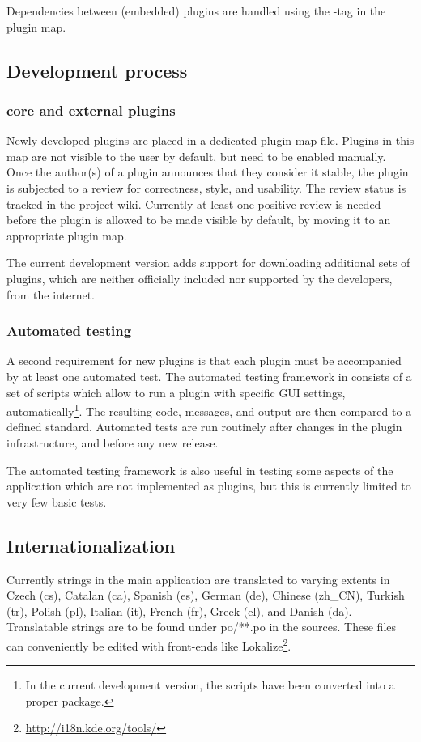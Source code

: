 Dependencies between (embedded) plugins are handled using the -tag in the plugin map.

\subsection{Development process}
\subsubsection[RKWard core and external plugins]{ core and external plugins}
\label{sec:technical_processes_plugins}
Newly developed plugins are placed in a dedicated plugin map file.
Plugins in this map are not visible to the user by
default, but need to be enabled manually. Once the author(s) of a plugin
announces that they consider it stable, the plugin is subjected to a review for
correctness, style, and usability. The review status is tracked in the project
wiki. Currently at least one positive review is needed before the plugin is
allowed to be made visible by default, by moving it to an appropriate plugin
map.

The current development version adds support for downloading additional sets of
plugins, which are neither officially included nor supported by the
 developers, from the internet.

\subsubsection{Automated testing}
\label{sec:technical_processes_automatedtesting}
A second requirement for new plugins is that each plugin must be accompanied by
at least one automated test. The automated testing framework in  consists
of a set of  scripts which allow to run a plugin with specific GUI settings,
automatically\footnote{
  In the current development version, the scripts have been converted into a proper
   package.
}. The resulting  code,  messages, and output are then compared
to a defined standard. Automated tests are run routinely after changes in the
plugin infrastructure, and before any new release.

The automated testing framework is also useful in testing some aspects of the
application which are not implemented as plugins, but this is currently limited
to very few basic tests.

\subsection{Internationalization}
\label{sec:technical_internationalization}
Currently strings in the main application are translated to varying extents in
Czech (cs), Catalan (ca), Spanish (es), German (de), Chinese (zh\_CN), Turkish
(tr), Polish (pl), Italian (it), French (fr), Greek (el), and Danish (da).
Translatable strings are to be found under po/**.po in the sources. These files
can conveniently be edited with front-ends like Lokalize\footnote{\url{http://i18n.kde.org/tools/}}. 

